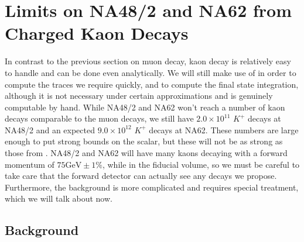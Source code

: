 \section{Limits on NA48/2 and NA62 from Charged Kaon Decays}
In contrast to the previous section on muon decay, kaon decay is relatively easy to handle and can be done even analytically.
We will still make use of \feyncalc in order to compute the traces we require quickly, and \mathematica to compute the final state integration, although it is not necessary under certain approximations and is genuinely computable by hand.
While NA48/2 and NA62 won't reach a number of kaon decays comparable to the muon decays, we still have $2.0 \times 10^{11}$ $K^+$ decays at NA48/2 and an expected $9.0 \times 10^{12}$ $K^+$ decays at NA62.
These numbers are large enough to put strong bounds on the scalar, but these will not be as strong as those from \mueee.
NA48/2 and NA62 will have many kaons decaying with a forward momentum of $75\textrm{GeV} \pm 1\%$, while in the fiducial volume, so we must be careful to take care that the forward detector can actually see any decays we propose.
Furthermore, the background is more complicated and requires special treatment, which we will talk about now.

\subsection{Background}
